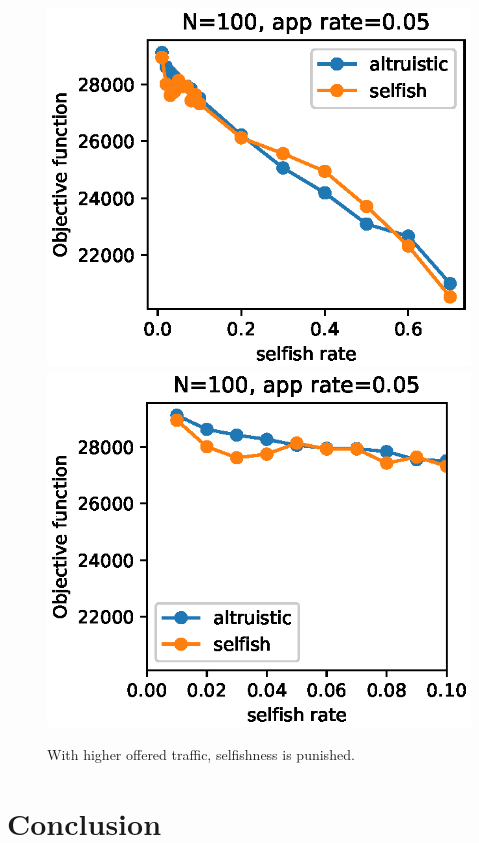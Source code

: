 \documentclass[conference,10.5pt]{IEEEtran}
\begin{document}
\begin{figure}[h]
  \includegraphics{figures/obj_func_vs_selfish_rate_parabola_02.eps}
  \includegraphics{figures/obj_func_vs_selfish_rate_parabola02_zoom.eps}
  \caption{With higher offered traffic, selfishness is punished.}
  \label{fig:par02}
\end{figure}
\clearpage
\section{Conclusion}
\end{document}
